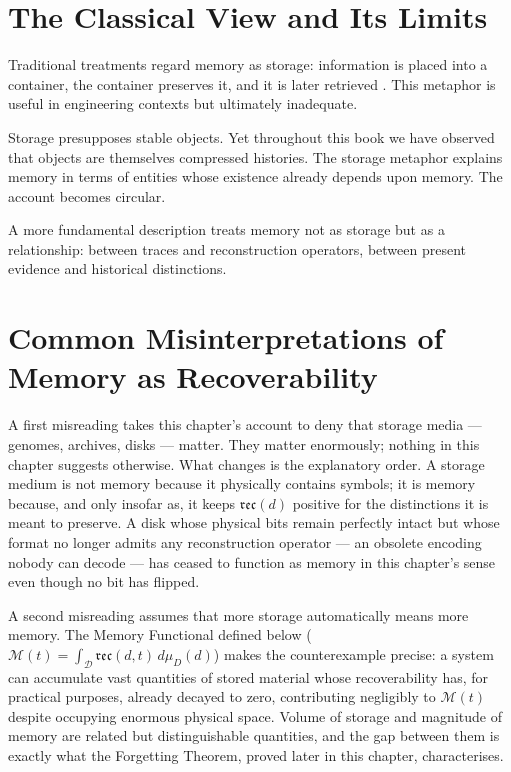\documentclass[12pt,twoside,openright]{book}
\newcommand{\reco}{\mathfrak{rec}}
\begin{document}
\section{The Classical View and Its Limits}
\label{sec:ch6-classical}

Traditional treatments regard memory as storage:
information is placed into a container, the container
preserves it, and it is later retrieved \parencite{james1890}.
This metaphor is useful in engineering contexts but
ultimately inadequate.

Storage presupposes stable objects. Yet throughout this
book we have observed that objects are themselves
compressed histories. The storage metaphor explains memory
in terms of entities whose existence already depends upon
memory. The account becomes circular.

A more fundamental description treats memory not as
storage but as a relationship: between traces and
reconstruction operators, between present evidence and
historical distinctions.

\section{Common Misinterpretations of Memory as
  Recoverability}
\label{sec:ch6-misinterpretations}

A first misreading takes this chapter's account to deny
that storage media --- genomes, archives, disks --- matter.
They matter enormously; nothing in this chapter suggests
otherwise. What changes is the explanatory order. A storage
medium is not memory because it physically contains symbols;
it is memory because, and only insofar as, it keeps
$\reco(d)$ positive for the distinctions it is meant to
preserve. A disk whose physical bits remain perfectly intact
but whose format no longer admits any reconstruction
operator --- an obsolete encoding nobody can decode --- has
ceased to function as memory in this chapter's sense even
though no bit has flipped.

A second misreading assumes that more storage automatically
means more memory. The Memory Functional defined below
($\mathcal{M}(t) = \int_\mathcal{D} \reco(d,t)\,d\mu_D(d)$)
makes the counterexample precise: a system can accumulate
vast quantities of stored material whose recoverability has,
for practical purposes, already decayed to zero, contributing
negligibly to $\mathcal{M}(t)$ despite occupying enormous
physical space. Volume of storage and magnitude of memory are
related but distinguishable quantities, and the gap between
them is exactly what the Forgetting Theorem, proved later in
this chapter, characterises.
\end{document}
